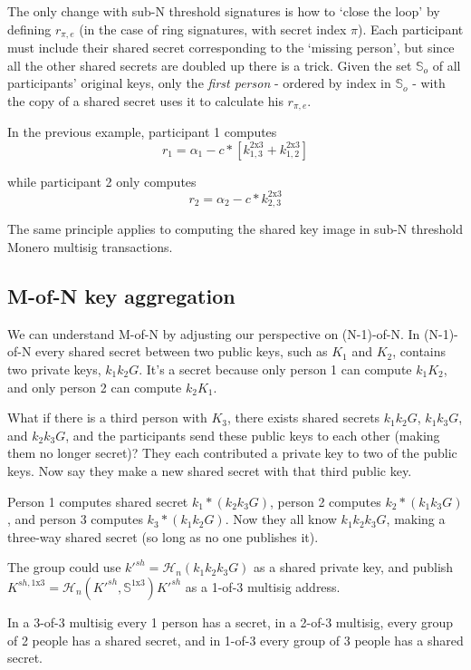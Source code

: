 The only change with sub-N threshold signatures is how to `close the loop' by defining $r_{\pi,e}$ (in the case of ring signatures, with secret index $\pi$). Each participant must include their shared secret corresponding to the `missing person', but since all the other shared secrets are doubled up there is a trick. Given the set $\mathbb{S}_o$ of all participants' original keys, only the {\em first person} - ordered by index in $\mathbb{S}_o$ - with the copy of a shared secret uses it to calculate his $r_{\pi,e}$. 

In the previous example, participant 1 computes 
\[ r_1 = \alpha_1 - c*[k^{\textrm{2x3}}_{1,3} + k^{\textrm{2x3}}_{1,2}]\] 

while participant 2 only computes
\[ r_2 = \alpha_2 - c*k^{\textrm{2x3}}_{2,3} \]

The same principle applies to computing the shared key image in sub-N threshold Monero multisig transactions.


\subsection{M-of-N key aggregation}
\label{sec:m-of-n}

We can understand M-of-N by adjusting our perspective on (N-1)-of-N. In (N-1)-of-N every shared secret between two public keys, such as $K_1$ and $K_2$, contains two private keys, $k_1 k_2 G$. It's a secret because only person 1 can compute $k_1 K_2$, and only person 2 can compute $k_2 K_1$.

What if there is a third person with $K_3$, there exists shared secrets $k_1 k_2 G$, $k_1 k_3 G$, and $k_2 k_3 G$, and the participants send these public keys to each other (making them no longer secret)? They each contributed a private key to two of the public keys. Now say they make a new shared secret with that third public key.

Person 1 computes shared secret $k_1*(k_2 k_3 G)$, person 2 computes $k_2*(k_1 k_3 G)$, and person 3 computes $k_3*(k_1 k_2 G)$. Now they all know $k_1 k_2 k_3 G$, making a three-way shared secret (so long as no one publishes it).

The group could use $k'^{sh} = \mathcal{H}_n(k_1 k_2 k_3 G)$ as a shared private key, and publish $K^{sh,\textrm{1x3}} = \mathcal{H}_n(K'^{sh},\mathbb{S}^{\textrm{1x3}}) K'^{sh}$ as a 1-of-3 multisig address.

In a 3-of-3 multisig every 1 person has a secret, in a 2-of-3 multisig, every group of 2 people has a shared secret, and in 1-of-3 every group of 3 people has a shared secret. 

